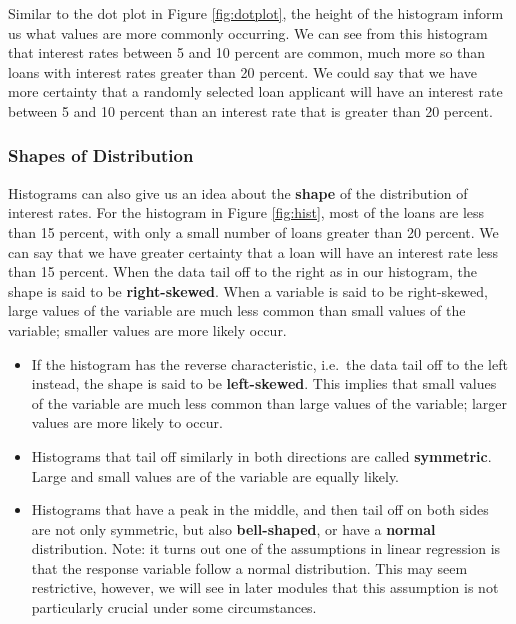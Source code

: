 \documentclass[
]{book}
\begin{document}
Similar to the dot plot in Figure \ref{fig:dotplot}, the height of the histogram inform us what values are more commonly occurring. We can see from this histogram that interest rates between 5 and 10 percent are common, much more so than loans with interest rates greater than 20 percent. We could say that we have more certainty that a randomly selected loan applicant will have an interest rate between 5 and 10 percent than an interest rate that is greater than 20 percent.

\subsubsection{Shapes of Distribution}\label{shapes-of-distribution}

Histograms can also give us an idea about the \textbf{shape} of the distribution of interest rates. For the histogram in Figure \ref{fig:hist}, most of the loans are less than 15 percent, with only a small number of loans greater than 20 percent. We can say that we have greater certainty that a loan will have an interest rate less than 15 percent. When the data tail off to the right as in our histogram, the shape is said to be \textbf{right-skewed}. When a variable is said to be right-skewed, large values of the variable are much less common than small values of the variable; smaller values are more likely occur.

\begin{itemize}
\item
  If the histogram has the reverse characteristic, i.e.~the data tail off to the left instead, the shape is said to be \textbf{left-skewed}. This implies that small values of the variable are much less common than large values of the variable; larger values are more likely to occur.
\item
  Histograms that tail off similarly in both directions are called \textbf{symmetric}. Large and small values are of the variable are equally likely.
\item
  Histograms that have a peak in the middle, and then tail off on both sides are not only symmetric, but also \textbf{bell-shaped}, or have a \textbf{normal} distribution. Note: it turns out one of the assumptions in linear regression is that the response variable follow a normal distribution. This may seem restrictive, however, we will see in later modules that this assumption is not particularly crucial under some circumstances.
\end{itemize}
\end{document}
